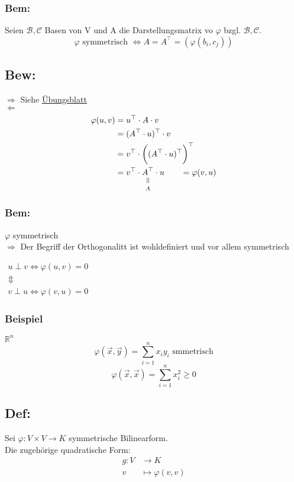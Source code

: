 \documentclass[titlepage,12pt,a4paper,ngerman]{report}
\newcommand{\verteq}{\rotatebox{90}{$\,=$}}
\newcommand{\equalto}[2]{\underset{\scriptstyle\overset{\mkern4mu\verteq}{#2}}{#1}}
\newcommand{\tx}[1]{\textrm{#1}}
\begin{document}
\subsubsection*{Bem:}
Seien $ \mathcal{B},\mathcal{C} $ Basen von V und A die Darstellungsmatrix vo $ \varphi $ bzgl. $ \mathcal{B},\mathcal{C} $.
$$ \varphi \tx{ symmetrisch } \Leftrightarrow A = A^\top = (\varphi(b_i,c_j))$$
\subsection{Bew:}
$\boxed{\Rightarrow}$ Siehe \underline{Übungsblatt}\\
$\boxed{\Leftarrow}$\\
\begin{align*}
\varphi(u,v) & = u^\top \cdot A \cdot v \\
& = (A^\top \cdot u)^\top \cdot v\\
& = v^\top \cdot \bigg( ( A^\top \cdot u)^\top \bigg)^\top\\
& = v^\top \cdot \equalto{A^\top}{A} \cdot u \qquad = \varphi(v,u) 
\end{align*}
\subsubsection*{Bem:}
$ \varphi $ symmetrisch\\
$ \Rightarrow $ Der Begriff der Orthogonalitt ist wohldefiniert und vor allem symmetrisch
\begin{center}
	$\begin{array}{c}
	u \perp v \Leftrightarrow \varphi(u,v) = 0\\
	\Updownarrow\\
	v \perp u \Leftrightarrow \varphi(v,u) = 0
	\end{array}$
\end{center}
\subsubsection{Beispiel}
$ \mathbb{R}^n $\\
$$\varphi(\vec{x},\vec{y}) = \sum_{i=1}^{n} x_i y_i \tx{ smmetrisch}$$ 
$$\varphi(\vec{x},\vec{x}) = \sum_{i=1}^{n} x_i^2 \ge 0$$
\subsection{Def:}
Sei $ \varphi: V \times V \to K $ symmetrische Bilinearform.\\
Die zugehörige quadratische Form:
\begin{align*}
g: V &\to K\\
v &\mapsto \varphi(v,v)
\end{align*}
\end{document}
